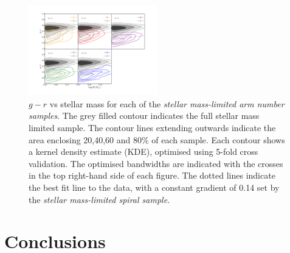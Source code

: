 \documentclass[useAMS,usenatbib]{mn2e}
\begin{document}
\begin{figure}
		\centering
		
        \includegraphics[width=0.5\textwidth]{Results_imgs/colour_mass_1.pdf}
		
        \caption{$g-r$ vs stellar mass for each of the \textit{stellar mass-limited arm number samples}. The grey filled contour indicates the full stellar mass limited sample. The contour lines extending outwards indicate the area enclosing 20,40,60 and 80\% of each sample. Each contour shows a kernel density estimate (KDE), optimised using 5-fold cross validation. The optimised bandwidths are indicated with the crosses in the top right-hand side of each figure. The dotted lines indicate the best fit line to the data, with a constant gradient of 0.14 set by the \textit{stellar mass-limited spiral sample}.}
		
        \label{fig:cm1}
        
\end{figure}
\section{Conclusions}
\label{sec:conclusions}
\end{document}
